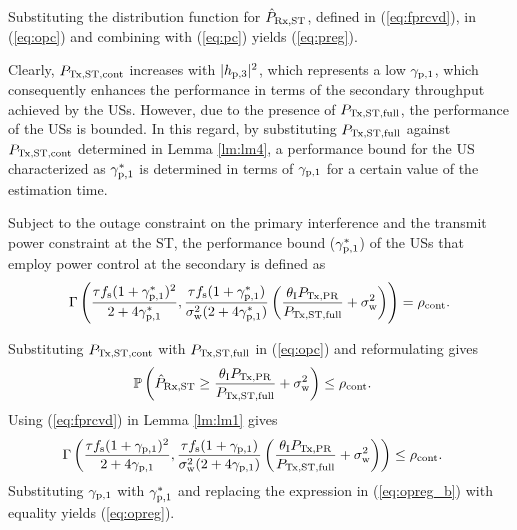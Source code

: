 \begin{IEEEproof}
Substituting the distribution function for $\hat{P}_{\text{Rx,ST}}$, defined in (\ref{eq:fprcvd}), in (\ref{eq:opc}) and combining with (\ref{eq:pc}) yields (\ref{eq:preg}).
\end{IEEEproof}
Clearly, $P_{\text{Tx,ST,cont}}$ increases with $|h_{\text{p,3}}|^2$, which represents a low ${\gamma}_{\text{p,1}}$, which consequently enhances the performance in terms of the secondary throughput achieved by the USs. However, due to the presence of $P_{\text{Tx,ST,full}}$, the performance of the USs is bounded. In this regard, by substituting $P_{\text{Tx,ST,full}}$ against $P_{\text{Tx,ST,cont}}$ determined in Lemma \ref{lm:lm4}, a performance bound for the US characterized as ${\gamma}_{\text{p,1}}^*$ is determined in terms of ${\gamma}_{\text{p,1}}$ for a certain value of the estimation time. 
\begin{coro} \label{cor:cor1}
\normalfont
Subject to the outage constraint on the primary interference and the transmit power constraint at the ST, the performance bound (${\gamma}_{\text{p,1}}^*$) of the USs that employ power control at the secondary is defined as %
\begin{align}
\Gamma\left(\frac{\tau f_{\text{s}} (1 + {\gamma}_{\text{p,1}}^*)^2}{2 + 4 {\gamma}_{\text{p,1}}^*}, \frac{\tau f_{\text{s}} (1  + {\gamma}_{\text{p,1}}^*)}{\sigma^2_{\text{w}} (2 + 4 {\gamma}_{\text{p,1}}^*)} \left( \frac{\theta_{\text{I}} P_{\text{Tx,PR}}}{P_{\text{Tx,ST,full}}} + \sigma^2_{\text{w}}  \right)  \right) = \rho_{\text{cont}}. \label{eq:opreg}  
\end{align}
\end{coro}
\begin{IEEEproof}
Substituting $P_{\text{Tx,ST,cont}}$ with $P_{\text{Tx,ST,full}}$ in (\ref{eq:opc}) and reformulating gives 
\begin{align}
\mathbb P\left( \hat{P}_{\text{Rx,ST}} \ge \frac{\theta_{\text{I}} P_{\text{Tx,PR}}}{P_{\text{Tx,ST,full}}} + \sigma^2_{\text{w}} \right) &\le \rho_{\text{cont}}. \label{eq:opreg_a} 
\end{align}
Using (\ref{eq:fprcvd}) in Lemma \ref{lm:lm1} gives
\begin{align}
\Gamma\left(\frac{\tau f_{\text{s}} (1 + {\gamma}_{\text{p,1}})^2}{2 + 4 {\gamma}_{\text{p,1}}}, \frac{\tau f_{\text{s}} (1  + {\gamma}_{\text{p,1}})}{\sigma^2_{\text{w}} (2 + 4 {\gamma}_{\text{p,1}})} \left( \frac{\theta_{\text{I}} P_{\text{Tx,PR}}}{P_{\text{Tx,ST,full}}} + \sigma^2_{\text{w}}  \right)  \right) &\le \rho_{\text{cont}}. \label{eq:opreg_b} 
\end{align}
Substituting ${\gamma}_{\text{p,1}}$ with ${\gamma}_{\text{p,1}}^*$ and replacing the expression in (\ref{eq:opreg_b}) with equality yields (\ref{eq:opreg}). 
\end{IEEEproof}
